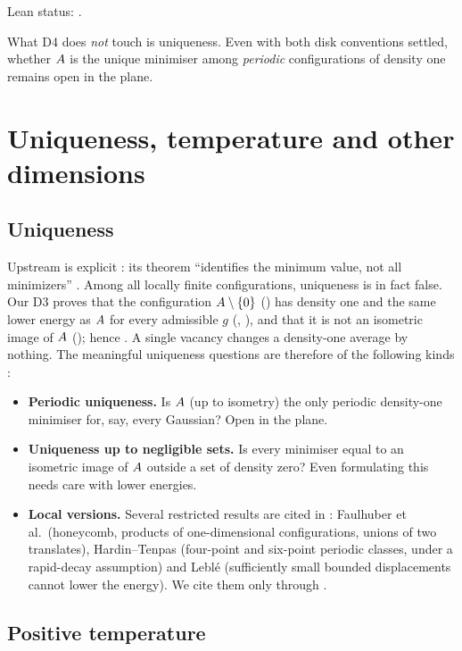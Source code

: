 Lean status: \DFourStatus.

What D4 does \emph{not} touch is uniqueness. Even with both disk conventions settled, whether $A$ is the unique
minimiser among \emph{periodic} configurations of density one remains open in the plane.

\section{Uniqueness, temperature and other dimensions}
\label{ch5:sec:unique}

\subsection{Uniqueness}

Upstream is explicit \tierL{}: its theorem ``identifies the minimum value, not all minimizers'' \cite{oai}. Among
all locally finite configurations, uniqueness is in fact false. Our D3 \tierA{} proves that the configuration
$A\setminus\{0\}$ () has density one and the same lower energy as $A$ for every admissible $g$
(, ), and that it is not an isometric image of $A$
(); hence . A single vacancy changes a
density-one average by nothing. The meaningful uniqueness questions are therefore of the following kinds \tierC{}:
\begin{itemize}[leftmargin=*]
\item \textbf{Periodic uniqueness.} Is $A$ (up to isometry) the only periodic density-one minimiser for, say,
  every Gaussian? Open in the plane.
\item \textbf{Uniqueness up to negligible sets.} Is every minimiser equal to an isometric image of $A$ outside a
  set of density zero? Even formulating this needs care with lower energies.
\item \textbf{Local versions.} Several restricted results are cited in \cite[\S1]{oai}: Faulhuber et al.\ (honeycomb,
  products of one-dimensional configurations, unions of two translates), Hardin--Tenpas (four-point and six-point
  periodic classes, under a rapid-decay assumption) and Lebl\'e (sufficiently small bounded displacements cannot
  lower the energy). We cite them only through \cite{oai}.
\end{itemize}

\subsection{Positive temperature}

